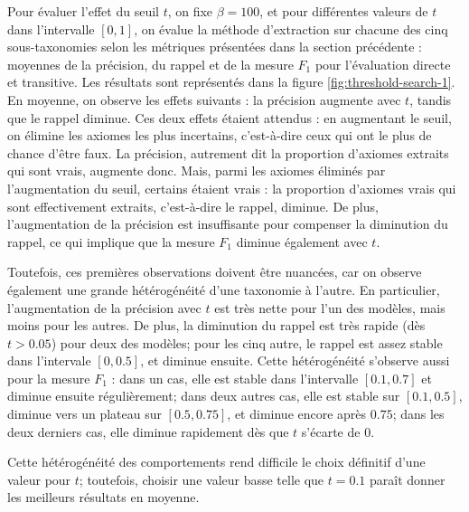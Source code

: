 Pour évaluer l'effet du seuil $t$, on fixe $\beta = 100$, et pour différentes valeurs de $t$ dans l'intervalle $[0, 1]$, on évalue la méthode d'extraction sur chacune des cinq sous-taxonomies selon les métriques présentées dans la section précédente : moyennes de la précision, du rappel et de la mesure $F_1$ pour l'évaluation directe et transitive.
%
Les résultats sont représentés dans la figure \ref{fig:threshold-search-1}. %
%
En moyenne, on observe les effets suivants : la précision augmente avec $t$, tandis que le rappel diminue. Ces deux effets étaient attendus : en augmentant le seuil, on élimine les axiomes les plus incertains, c'est-à-dire ceux qui ont le plus de chance d'être faux. La précision, autrement dit la proportion d'axiomes extraits qui sont vrais, augmente donc. Mais, parmi les axiomes éliminés par l'augmentation du seuil, certains étaient vrais : la proportion d'axiomes vrais qui sont effectivement extraits, c'est-à-dire le rappel, diminue.
%
De plus, l'augmentation de la précision est insuffisante pour compenser la diminution du rappel, ce qui implique que la mesure $F_1$ diminue également avec $t$. 

Toutefois, ces premières observations doivent être nuancées, car on observe également une grande hétérogénéité d'une taxonomie à l'autre. En particulier, l'augmentation de la précision avec $t$ est très nette pour l'un des modèles, mais moins pour les autres. De plus, la diminution du rappel est très rapide (dès $t > 0.05$) pour deux des modèles; pour les cinq autre, le rappel est assez stable dans l'intervale $[0, 0.5]$, et diminue ensuite. Cette hétérogénéité s'observe aussi pour la mesure $F_1$ : dans un cas, elle est stable dans l'intervalle $[0.1, 0.7]$ et diminue ensuite régulièrement; dans deux autres cas, elle est stable sur $[0.1, 0.5]$, diminue vers un plateau sur $[0.5, 0.75]$, et diminue encore après $0.75$; dans les deux derniers cas, elle diminue rapidement dès que $t$ s'écarte de $0$.

Cette hétérogénéité des comportements rend difficile le choix définitif d'une valeur pour $t$; toutefois, choisir une valeur basse telle que $t = 0.1$ paraît donner les meilleurs résultats en moyenne.

